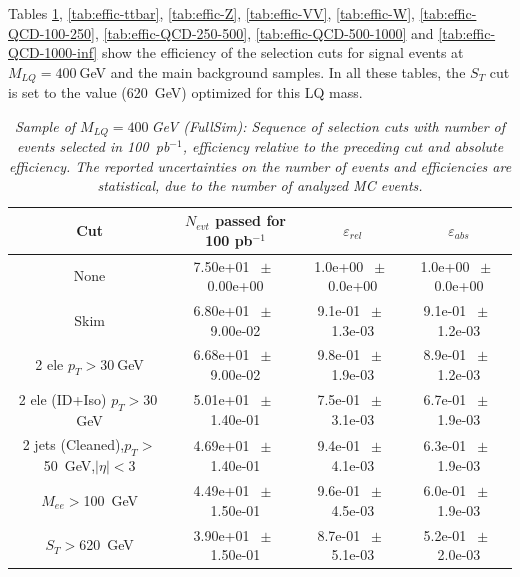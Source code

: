 Tables  
\ref{tab:effic-MLQ400}, 
\ref{tab:effic-ttbar}, 
\ref{tab:effic-Z}, 
\ref{tab:effic-VV},
\ref{tab:effic-W},
\ref{tab:effic-QCD-100-250},
\ref{tab:effic-QCD-250-500},
\ref{tab:effic-QCD-500-1000} and
\ref{tab:effic-QCD-1000-inf}
show the efficiency of the selection cuts for signal events at $M_{LQ}=400~$GeV and the main background samples.
In all these tables, the $S_T$ cut is set to the value (620~GeV) optimized for this LQ mass.  

\begin{table}[htbp] 
\begin{center} 
\begin{tabular}{|c|c|c|c|} 
\hline\hline 
 Cut & $N_{evt}$ passed for 100 pb$^{-1}$ & $\varepsilon_{rel}$ & $\varepsilon_{abs}$ \\ 
\hline\hline 
None       &        7.50e+01       $~\pm~$       0.00e+00        &        1.0e+00       $~\pm~$       0.0e+00        &        1.0e+00       $~\pm~$       0.0e+00       \\       
       Skim       &        6.80e+01       $~\pm~$       9.00e-02        &        9.1e-01       $~\pm~$       1.3e-03        &        9.1e-01       $~\pm~$       1.2e-03       \\       
       2 ele $p_T>30~$GeV       &        6.68e+01       $~\pm~$       9.00e-02        &        9.8e-01       $~\pm~$       1.9e-03        &        8.9e-01       $~\pm~$       1.2e-03       \\       
       2 ele (ID+Iso) $p_T>30~$GeV       &        5.01e+01       $~\pm~$       1.40e-01        &        7.5e-01       $~\pm~$       3.1e-03        &        6.7e-01       $~\pm~$       1.9e-03       \\       
       2 jets (Cleaned),$p_T>$50~GeV,$|\eta|<$3       &        4.69e+01       $~\pm~$       1.40e-01        &        9.4e-01       $~\pm~$       4.1e-03        &        6.3e-01       $~\pm~$       1.9e-03       \\       
       $M_{ee}>$100~GeV       &        4.49e+01       $~\pm~$       1.50e-01        &        9.6e-01       $~\pm~$       4.5e-03        &        6.0e-01       $~\pm~$       1.9e-03       \\       
       $S_T>$620~GeV       &        3.90e+01       $~\pm~$       1.50e-01        &        8.7e-01       $~\pm~$       5.1e-03        &        5.2e-01       $~\pm~$       2.0e-03       \\       
          \hline\hline 
\end{tabular} 
\end{center} 
\caption{\small \sl Sample of $M_{LQ}=400~$GeV (FullSim): Sequence of selection cuts with number of events selected in 100~pb$^{-1}$, efficiency relative to the preceding cut and absolute efficiency. The reported uncertainties on the number of events and efficiencies are statistical, due to the number of analyzed MC events.} 
\label{tab:effic-MLQ400} 
\end{table} 

